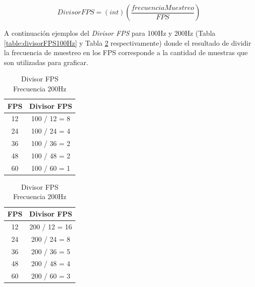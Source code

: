 \documentclass[12pt,a4paper]{article}
\begin{document}
\begin{equation}
\label{eq:divisorFPS}
DivisorFPS=(int)\left(\frac{frecuenciaMuestreo}{FPS}\right)
\end{equation}

A continuación ejemplos del \textit{Divisor FPS} para 100Hz y 200Hz (Tabla \ref{table:divisorFPS100Hz} y Tabla \ref{table:divisorFPS200Hz} respectivamente) donde el resultado de dividir la frecuencia de muestreo en los FPS corresponde a la cantidad de muestras que son utilizadas para graficar.

\begin{table}[!htb]
	\begin{minipage}{.5\linewidth}
		\centering
			\begin{tabular}{|c|c|}
				\hline
				\textbf{FPS} & \multicolumn{1}{l|}{\textbf{Divisor FPS}} \\ \hline
				12           & 100 / 12 = 8                                         \\ \hline
				24           & 100 / 24 = 4                                         \\ \hline
				36           & 100 / 36 = 2                                         \\ \hline
				48           & 100 / 48 = 2                                         \\ \hline
				60           & 100 / 60 = 1                                         \\ \hline
			\end{tabular}
			\caption{Divisor FPS Frecuencia 100Hz}
			\label{table:divisorFPS100Hz}
	\end{minipage}%
	\begin{minipage}{.5\linewidth}
		\centering
		\begin{tabular}{|c|c|}
			\hline
			\textbf{FPS} & \multicolumn{1}{l|}{\textbf{Divisor FPS}} \\ \hline
				12           & 200 / 12 = 16                             \\ \hline
				24           & 200 / 24 = 8                              \\ \hline
				36           & 200 / 36 = 5                              \\ \hline
				48           & 200 / 48 = 4                              \\ \hline
				60           & 200 / 60 = 3                              \\ \hline
		\end{tabular}
		\caption{Divisor FPS Frecuencia 200Hz}
		\label{table:divisorFPS200Hz}
	\end{minipage}
\end{table}
\end{document}
